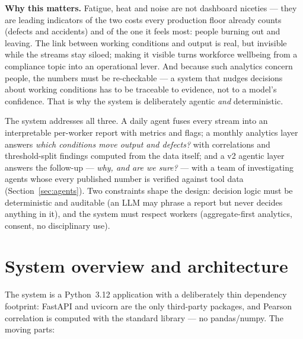 \documentclass[11pt,a4paper]{article}
\begin{document}
\textbf{Why this matters.} Fatigue, heat and noise are not dashboard
niceties --- they are leading indicators of the two costs every production
floor already counts (defects and accidents) and of the one it feels most:
people burning out and leaving. The link between working conditions and
output is real, but invisible while the streams stay siloed; making it
visible turns workforce wellbeing from a compliance topic into an
operational lever. And because such analytics concern people, the numbers
must be re-checkable --- a system that nudges decisions about working
conditions has to be traceable to evidence, not to a model's confidence.
That is why the system is deliberately agentic \emph{and} deterministic.

The system addresses all three. A daily agent fuses every stream into an
interpretable per-worker report with metrics and flags; a monthly analytics
layer answers \emph{which conditions move output and defects?} with
correlations and threshold-split findings computed from the data itself;
and a v2 agentic layer answers the follow-up --- \emph{why, and are we
sure?} --- with a team of investigating agents whose every published number
is verified against tool data (Section~\ref{sec:agents}). Two constraints shape the design:
decision logic must be deterministic and auditable (an LLM may phrase a
report but never decides anything in it), and the system must respect
workers (aggregate-first analytics, consent, no disciplinary use).

\section{System overview and architecture}
The system is a Python~3.12 application with a deliberately thin dependency
footprint: FastAPI and uvicorn are the only third-party packages, and
Pearson correlation is computed with the standard library --- no
pandas/numpy. The moving parts:
\end{document}
